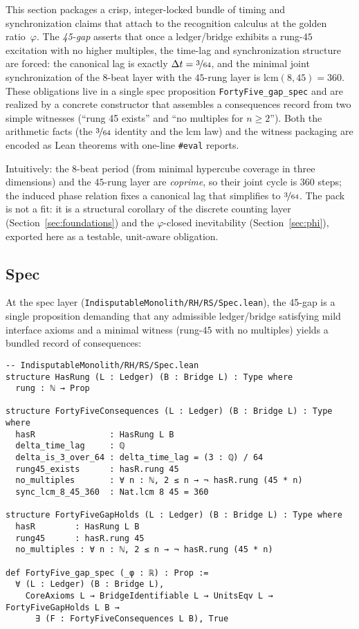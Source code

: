 \documentclass[11pt,a4paper,twoside]{article}
\numberwithin{equation}{section}
\theoremstyle{customthm}
\theoremstyle{customdef}
\theoremstyle{customrem}
\begin{document}
This section packages a crisp, integer-locked bundle of timing and synchronization claims that attach to the recognition calculus at the golden ratio~$\varphi$. The \emph{45-gap} asserts that once a ledger/bridge exhibits a rung-$45$ excitation with no higher multiples, the time-lag and synchronization structure are forced: the canonical lag is exactly $\Delta t = \nicefrac{3}{64}$, and the minimal joint synchronization of the $8$-beat layer with the $45$-rung layer is $\mathrm{lcm}(8,45)=360$. These obligations live in a single spec proposition \texttt{FortyFive\_gap\_spec} and are realized by a concrete constructor that assembles a consequences record from two simple witnesses (``rung 45 exists'' and ``no multiples for $n\ge 2$''). Both the arithmetic facts (the $\nicefrac{3}{64}$ identity and the $\mathrm{lcm}$ law) and the witness packaging are encoded as Lean theorems with one-line \texttt{\#eval} reports.

Intuitively: the $8$-beat period (from minimal hypercube coverage in three dimensions) and the $45$-rung layer are \emph{coprime}, so their joint cycle is $360$ steps; the induced phase relation fixes a canonical lag that simplifies to $\nicefrac{3}{64}$. The pack is not a fit: it is a structural corollary of the discrete counting layer (Section~\ref{sec:foundations}) and the $\varphi$-closed inevitability (Section~\ref{sec:phi}), exported here as a testable, unit-aware obligation.

\subsection{Spec}\label{subsec:gap45-spec}

At the spec layer (\texttt{IndisputableMonolith/RH/RS/Spec.lean}), the 45-gap is a single proposition demanding that any admissible ledger/bridge satisfying mild interface axioms and a minimal witness (rung-$45$ with no multiples) yields a bundled record of consequences:

\begin{lstlisting}
-- IndisputableMonolith/RH/RS/Spec.lean
structure HasRung (L : Ledger) (B : Bridge L) : Type where
  rung : ℕ → Prop

structure FortyFiveConsequences (L : Ledger) (B : Bridge L) : Type where
  hasR               : HasRung L B
  delta_time_lag     : ℚ
  delta_is_3_over_64 : delta_time_lag = (3 : ℚ) / 64
  rung45_exists      : hasR.rung 45
  no_multiples       : ∀ n : ℕ, 2 ≤ n → ¬ hasR.rung (45 * n)
  sync_lcm_8_45_360  : Nat.lcm 8 45 = 360

structure FortyFiveGapHolds (L : Ledger) (B : Bridge L) : Type where
  hasR        : HasRung L B
  rung45      : hasR.rung 45
  no_multiples : ∀ n : ℕ, 2 ≤ n → ¬ hasR.rung (45 * n)

def FortyFive_gap_spec (_φ : ℝ) : Prop :=
  ∀ (L : Ledger) (B : Bridge L),
    CoreAxioms L → BridgeIdentifiable L → UnitsEqv L → FortyFiveGapHolds L B →
      ∃ (F : FortyFiveConsequences L B), True
\end{lstlisting}
\end{document}
